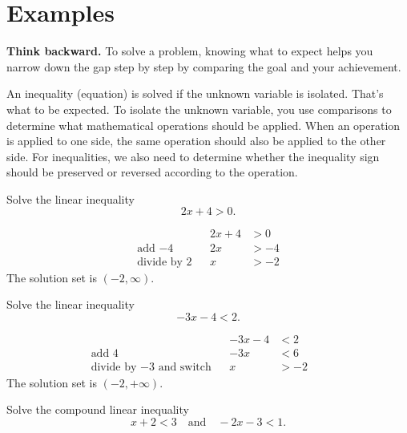 \documentclass[en,12pt]{elegantbook}
\let\BeginKnitrBlock\begin \let\EndKnitrBlock\end
\begin{document}
\hypertarget{examples}{%
\section{Examples}\label{examples}}

\BeginKnitrBlock{rmdtip}
\textbf{Think backward.} To solve a problem, knowing what to expect helps you narrow down the gap step by step by comparing the goal and your achievement.

An inequality (equation) is solved if the unknown variable is isolated. That's what to be expected. To isolate the unknown variable, you use comparisons to determine what mathematical operations should be applied. When an operation is applied to one side, the same operation should also be applied to the other side. For inequalities, we also need to determine whether the inequality sign should be preserved or reversed according to the operation.
\EndKnitrBlock{rmdtip}

\BeginKnitrBlock{example}
\protect\hypertarget{exm:unnamed-chunk-221}{}{\label{exm:unnamed-chunk-221} }Solve the linear inequality
\[
2x+4>0.
\]
\EndKnitrBlock{example}

\BeginKnitrBlock{solution}
{}\[
\begin{aligned}
&  & 2x+4 & >0  \\
    \text{add $-4$}      &  & 2x   & >-4 \\
    \text{divide by $2$} &  & x    & >-2
\end{aligned}
\]
The solution set is \((-2, \infty)\).
\EndKnitrBlock{solution}

\BeginKnitrBlock{example}
\protect\hypertarget{exm:unnamed-chunk-223}{}{\label{exm:unnamed-chunk-223} }Solve the linear inequality
\[
-3x-4<2.
\]
\EndKnitrBlock{example}

\BeginKnitrBlock{solution}
{}\[
\begin{aligned}
                                        &  & -3x-4 & <2       \\
    \text{add $4$}                   &  & -3x   & <6  &  & \\
    \text{divide by $-3$ and switch} &  & x     & >-2
\end{aligned}
\]
The solution set is \((-2, +\infty)\).
\EndKnitrBlock{solution}

\BeginKnitrBlock{example}
\protect\hypertarget{exm:unnamed-chunk-225}{}{\label{exm:unnamed-chunk-225} }Solve the compound linear inequality
\[
x+2<3\quad \text{and}\quad -2x-3<1.
\]
\EndKnitrBlock{example}
\end{document}
